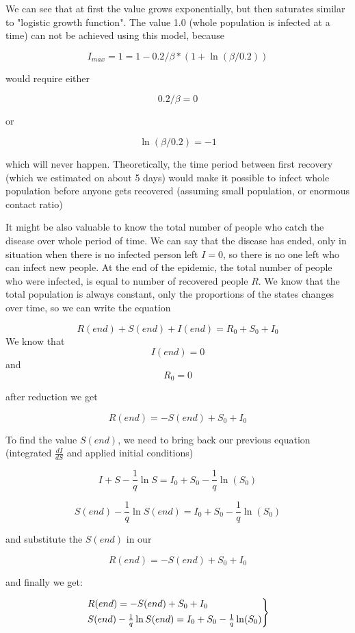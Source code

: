\documentclass[nostrict]{szablonPG}
\begin{document}
We can see that at first the value grows exponentially, but then saturates similar to "logistic growth function". The value 1.0 (whole population is infected at a time) can not be achieved using this model, because

\[I_{max} = 1 = 1 - 0.2/\beta * (1 + \ln(\beta/0.2))\]

would require either 

\[0.2/\beta = 0\]

or 

\[\ln(\beta/0.2) = -1\]

which will never happen. 
Theoretically, the time period between first recovery (which we estimated on about 5 days) would make it possible to infect whole population before anyone gets recovered (assuming small population, or enormous contact ratio)

It might be also valuable to know the total number of people who catch the disease over whole period of time.
We can say that the disease has ended, only in situation when there is no infected person left $I = 0$, so there is no one left who can infect new people.
At the end of the epidemic, the total number of people who were infected, is equal to number of recovered people $R$. 
We know that the total population is always constant, only the proportions of the states changes over time, so we can write the equation

\[R(end) + S(end) + I(end) = R_0 + S_0 + I_0\]
We know that 
\[I(end) = 0\] and \[R_0 = 0\]

after reduction we get

\[R(end) = -S(end) + S_0 + I_0\]

To find the value $S(end)$, we need to bring back our previous equation (integrated $\frac{dI}{dS}$ and applied initial conditions)

\[I + S - \frac{1}{q} \ln{S} = I_0 + S_0 - \frac{1}{q} \ln(S_0)\]

\[S(end) - \frac{1}{q} \ln{S(end)} = I_0 + S_0 - \frac{1}{q} \ln(S_0)\]

and substitute the $S(end)$ in our

\[R(end) = -S(end) + S_0 + I_0\]

and finally we get:

\[
\begin{rcases}
R(end) = -S(end) + S_0 + I_0 \\
S(end) - \frac{1}{q} \ln{S(end)} = I_0 + S_0 - \frac{1}{q} \ln(S_0)
\end{rcases}
\]
\end{document}
